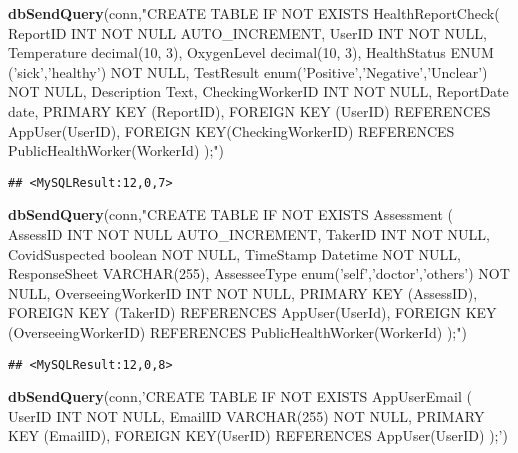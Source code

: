 \documentclass[
]{article}
\newenvironment{Shaded}{\begin{snugshade}}{\end{snugshade}}
\newcommand{\KeywordTok}[1]{\textcolor[rgb]{0.13,0.29,0.53}{\textbf{#1}}}
\newcommand{\NormalTok}[1]{#1}
\newcommand{\StringTok}[1]{\textcolor[rgb]{0.31,0.60,0.02}{#1}}
\begin{document}
\begin{Shaded}
\begin{Highlighting}[]
\KeywordTok{dbSendQuery}\NormalTok{(conn,}\StringTok{"CREATE TABLE IF NOT EXISTS HealthReportCheck(}
\StringTok{  ReportID INT NOT NULL AUTO_INCREMENT, }
\StringTok{  UserID INT NOT NULL, }
\StringTok{  Temperature decimal(10, 3), }
\StringTok{  OxygenLevel decimal(10, 3), }
\StringTok{  HealthStatus ENUM ('sick','healthy') NOT NULL, }
\StringTok{  TestResult enum('Positive','Negative','Unclear') NOT NULL, }
\StringTok{  Description Text, }
\StringTok{  CheckingWorkerID INT NOT NULL, }
\StringTok{  ReportDate date,}
\StringTok{  PRIMARY KEY (ReportID), }
\StringTok{  FOREIGN KEY (UserID) REFERENCES AppUser(UserID), }
\StringTok{  FOREIGN KEY(CheckingWorkerID) REFERENCES PublicHealthWorker(WorkerId)}
\StringTok{);"}\NormalTok{)}
\end{Highlighting}
\end{Shaded}

\begin{verbatim}
## <MySQLResult:12,0,7>
\end{verbatim}

\begin{Shaded}
\begin{Highlighting}[]
\KeywordTok{dbSendQuery}\NormalTok{(conn,}\StringTok{"CREATE TABLE IF NOT EXISTS Assessment (}
\StringTok{  AssessID INT NOT NULL AUTO_INCREMENT, }
\StringTok{  TakerID INT NOT NULL, }
\StringTok{  CovidSuspected boolean NOT NULL, }
\StringTok{  TimeStamp Datetime NOT NULL, }
\StringTok{  ResponseSheet VARCHAR(255), }
\StringTok{  AssesseeType enum('self','doctor','others') NOT NULL, }
\StringTok{  OverseeingWorkerID INT NOT NULL, }
\StringTok{  PRIMARY KEY (AssessID), }
\StringTok{  FOREIGN KEY (TakerID) REFERENCES AppUser(UserId), }
\StringTok{  FOREIGN KEY (OverseeingWorkerID) REFERENCES PublicHealthWorker(WorkerId)}
\StringTok{);"}\NormalTok{)}
\end{Highlighting}
\end{Shaded}

\begin{verbatim}
## <MySQLResult:12,0,8>
\end{verbatim}

\begin{Shaded}
\begin{Highlighting}[]
\KeywordTok{dbSendQuery}\NormalTok{(conn,}\StringTok{'CREATE TABLE IF NOT EXISTS AppUserEmail (}
\StringTok{  UserID INT NOT NULL, }
\StringTok{  EmailID VARCHAR(255) NOT NULL, }
\StringTok{  PRIMARY KEY (EmailID), }
\StringTok{  FOREIGN KEY(UserID) REFERENCES AppUser(UserID)}
\StringTok{);'}\NormalTok{)}
\end{Highlighting}
\end{Shaded}
\end{document}
